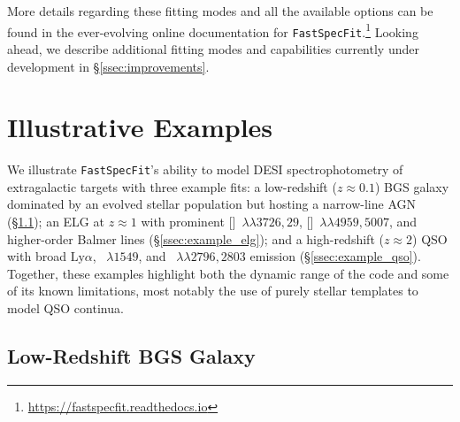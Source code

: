 \documentclass[modern,linenumbers]{aastex702}
\newcommand{\fastspecfit}{\texttt{FastSpecFit}}
\newcommand{\lya}{\ensuremath{\mathrm{Ly}\alpha}}
\newcommand{\mgiidoublet}{\ion{Mg}{2}~$\lambda\lambda2796,2803$}
\newcommand{\oiidoublet}{[\ion{O}{2}]~$\lambda\lambda3726,29$}
\newcommand{\oiiidoublet}{[\ion{O}{3}]~$\lambda\lambda4959,5007$}
\begin{document}
More details regarding these fitting modes and all the available
options can be found in the ever-evolving online documentation for
\fastspecfit.\footnote{\url{https://fastspecfit.readthedocs.io}}
Looking ahead, we describe additional fitting modes and capabilities
currently under development in \S\ref{ssec:improvements}.

\section{Illustrative Examples}
\label{sec:casestudy}

We illustrate \fastspecfit's ability to model DESI spectrophotometry
of extragalactic targets with three example fits: a low-redshift
($z\approx0.1$) BGS galaxy dominated by an evolved stellar population
but hosting a narrow-line AGN (\S\ref{ssec:example_bgs}); an ELG at $z
\approx 1$ with prominent \oiidoublet, \oiiidoublet, and higher-order
Balmer lines (\S\ref{ssec:example_elg}); and a high-redshift
($z\approx2$) QSO with broad \lya, ~$\lambda1549$, and
\mgiidoublet{} emission (\S\ref{ssec:example_qso}). Together, these
examples highlight both the dynamic range of the code and some of its
known limitations, most notably the use of purely stellar templates to
model QSO continua.

\subsection{Low-Redshift BGS Galaxy}
\label{ssec:example_bgs}
\end{document}
